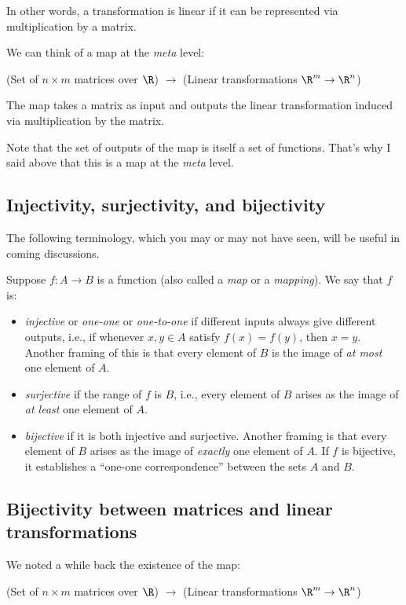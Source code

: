 \documentclass[10pt]{amsart}
\begin{document}
In other words, a transformation is linear if it can be represented
via multiplication by a matrix.

We can think of a map at the {\em meta} level:

(Set of $n \times m$ matrices over $\R$) $\to$ (Linear transformations
$\R^m \to \R^n$)

The map takes a matrix as input and outputs the linear transformation
induced via multiplication by the matrix.

Note that the set of outputs of the map is itself a set of
functions. That's why I said above that this is a map at the {\em
  meta} level.
\subsection{Injectivity, surjectivity, and bijectivity}

The following terminology, which you may or may not have seen, will be
useful in coming discussions.

Suppose $f:A \to B$ is a function (also called a {\em map} or a
{\em mapping}). We say that $f$ is:

\begin{itemize}
\item {\em injective} or {\em one-one} or {\em one-to-one} if
  different inputs always give different outputs, i.e., if whenever
  $x,y \in A$ satisfy $f(x) = f(y)$, then $x = y$. Another framing of
  this is that every element of $B$ is the image of {\em at most} one
  element of $A$.
\item {\em surjective} if the range of $f$ is $B$, i.e., every element
  of $B$ arises as the image of {\em at least} one element of $A$.
\item {\em bijective} if it is both injective and surjective. Another
  framing is that every element of $B$ arises as the image of {\em
    exactly} one element of $A$. If $f$ is bijective, it establishes a
  ``one-one correspondence'' between the sets $A$ and $B$.
\end{itemize}

\subsection{Bijectivity between matrices and linear transformations}

We noted a while back the existence of the map:

(Set of $n \times m$ matrices over $\R$) $\to$ (Linear transformations
$\R^m \to \R^n$)
\end{document}
